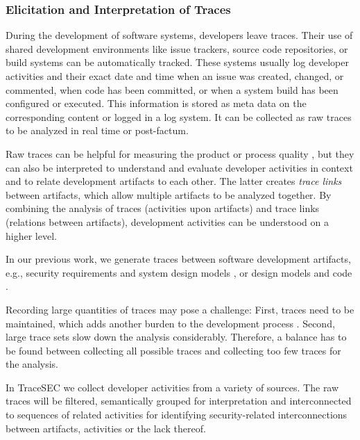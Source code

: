 \vspace{-0.5em}
\subsubsection*{Elicitation and Interpretation of Traces}
\vspace{-1em}
During the development of software systems, developers leave traces. Their use of shared development environments like issue trackers, source code repositories, or build systems can be automatically tracked. These systems usually log developer activities and their exact date and time when an issue was created, changed, or commented, when code has been committed, or when a system build has been configured or executed. This information is stored as meta data on the corresponding content or logged in a log system. It can be collected as raw traces to be analyzed in real time or post-factum.

Raw traces can be helpful for measuring the product \cite{ProductMeasures} or process quality \cite{ProcessMeasures}, but they can also be interpreted to understand and evaluate developer activities  in context \cite{TraceInterpretation} and to relate development artifacts to each other. The latter creates \emph{trace links} between artifacts, which allow multiple artifacts to be analyzed together. By combining the analysis of traces (activities upon artifacts) and trace links (relations between artifacts), development activities can be understood on a higher level.

In our previous work, we generate traces between software development artifacts, e.g., security requirements and system design models \cite{Houmb2009}, or design models and code \cite{Peldszus2019}.

Recording large quantities of traces may pose a challenge: First, traces need to be maintained, which adds another burden to the development process \cite{TraceMaintenance}. Second, large trace sets slow down the analysis considerably. Therefore, a balance has to be found between collecting all possible traces and collecting too few traces for the analysis.

In TraceSEC we collect developer activities from a variety of sources. The raw traces will be filtered, semantically grouped for interpretation and interconnected to sequences of related activities for identifying security-related interconnections between artifacts, activities or the lack thereof.

\vspace{-0.5em}
